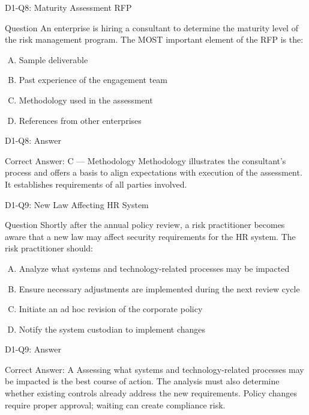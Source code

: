 \documentclass{beamer}
\begin{document}
	\begin{frame}{D1-Q8: Maturity Assessment RFP}
		\begin{block}{Question}
			An enterprise is hiring a consultant to determine the maturity level of the risk management program. The MOST important element of the RFP is the:
		\end{block}
		\begin{enumerate}[(A)]
			\item Sample deliverable
			\item Past experience of the engagement team
			\item Methodology used in the assessment
			\item References from other enterprises
		\end{enumerate}
	\end{frame}
	\begin{frame}{D1-Q8: Answer}
		\begin{block}{Correct Answer: C --- Methodology}
			Methodology illustrates the consultant's process and offers a basis to align expectations with execution of the assessment. It establishes requirements of all parties involved.
		\end{block}
	\end{frame}
	
	\begin{frame}{D1-Q9: New Law Affecting HR System}
		\begin{block}{Question}
			Shortly after the annual policy review, a risk practitioner becomes aware that a new law may affect security requirements for the HR system. The risk practitioner should:
		\end{block}
		\begin{enumerate}[(A)]
			\item Analyze what systems and technology-related processes may be impacted
			\item Ensure necessary adjustments are implemented during the next review cycle
			\item Initiate an ad hoc revision of the corporate policy
			\item Notify the system custodian to implement changes
		\end{enumerate}
	\end{frame}
	\begin{frame}{D1-Q9: Answer}
		\begin{block}{Correct Answer: A}
			Assessing what systems and technology-related processes may be impacted is the best course of action. The analysis must also determine whether existing controls already address the new requirements. Policy changes require proper approval; waiting can create compliance risk.
		\end{block}
	\end{frame}
	
\end{document}
